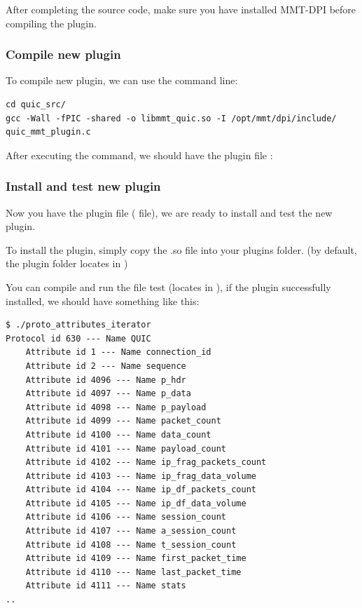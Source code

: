 After completing the source code, make sure you have installed MMT-DPI before compiling the plugin.

\subsubsection{Compile new plugin}

To compile new plugin, we can use the command line:

\begin{lstlisting}[style=BASH]
cd quic_src/
gcc -Wall -fPIC -shared -o libmmt_quic.so -I /opt/mmt/dpi/include/ quic_mmt_plugin.c
\end{lstlisting}

After executing the command, we should have the plugin file : 

\subsubsection{Install and test new plugin}

Now you have the plugin file ( file), we are ready to install and test the new plugin.

To install the plugin, simply copy the .so file into your plugins folder. (by default, the plugin folder locates in )

You can compile and run the file test  (locates in ), if the plugin successfully installed, we should have something like this:

\begin{lstlisting}[style=Cpp]
$ ./proto_attributes_iterator
Protocol id 630 --- Name QUIC
    Attribute id 1 --- Name connection_id 
    Attribute id 2 --- Name sequence 
    Attribute id 4096 --- Name p_hdr 
    Attribute id 4097 --- Name p_data 
    Attribute id 4098 --- Name p_payload 
    Attribute id 4099 --- Name packet_count 
    Attribute id 4100 --- Name data_count 
    Attribute id 4101 --- Name payload_count 
    Attribute id 4102 --- Name ip_frag_packets_count 
    Attribute id 4103 --- Name ip_frag_data_volume 
    Attribute id 4104 --- Name ip_df_packets_count 
    Attribute id 4105 --- Name ip_df_data_volume 
    Attribute id 4106 --- Name session_count 
    Attribute id 4107 --- Name a_session_count 
    Attribute id 4108 --- Name t_session_count 
    Attribute id 4109 --- Name first_packet_time 
    Attribute id 4110 --- Name last_packet_time 
    Attribute id 4111 --- Name stats 
.. 
\end{lstlisting}

